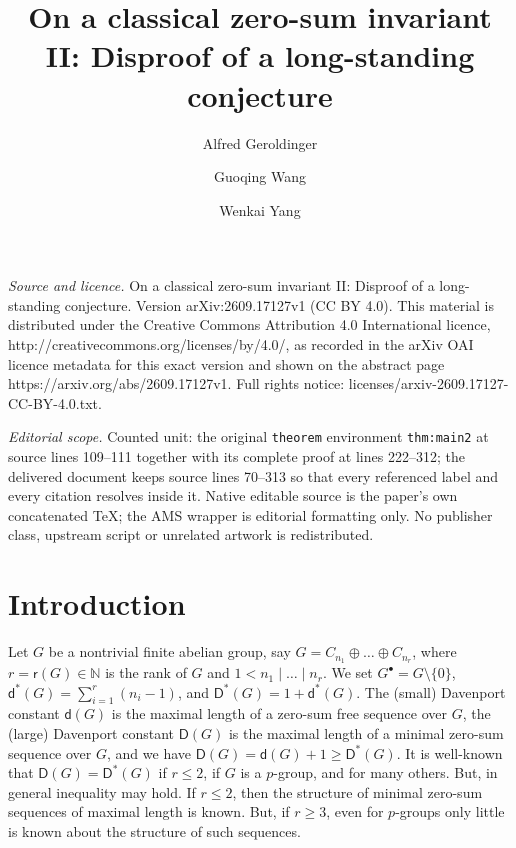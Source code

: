 \documentclass[10pt,a4paper]{amsart}
\begin{document}
\title[On a classical zero-sum invariant II: Disproof of a long-sta]{On a classical zero-sum invariant II: Disproof of a long-standing conjecture}
\author{Alfred Geroldinger \and Guoqing Wang \and Wenkai Yang}
\date{}
\maketitle
\noindent\emph{Source and licence.} On a classical zero-sum invariant II: Disproof of a long-standing conjecture. Version arXiv:2609.17127v1 (CC BY 4.0). This material is distributed under the Creative Commons Attribution 4.0 International licence, http://creativecommons.org/licenses/by/4.0/, as recorded in the arXiv OAI licence metadata for this exact version and shown on the abstract page https://arxiv.org/abs/2609.17127v1. Full rights notice: licenses/arxiv-2609.17127-CC-BY-4.0.txt.\par\smallskip
\noindent\textit{Editorial scope.} Counted unit: the original \texttt{theorem} environment \texttt{thm:main2} at source lines 109--111 together with its complete proof at lines 222--312; the delivered document keeps source lines 70--313 so that every referenced label and every citation resolves inside it. Native editable source is the paper's own concatenated TeX; the AMS wrapper is editorial formatting only. No publisher class, upstream script or unrelated artwork is redistributed.
\section{Introduction}


Let $G$ be a nontrivial finite abelian group, say $G = C_{n_1} \oplus \ldots \oplus C_{n_r}$, where $r=\mathsf r (G) \in \mathbb N$ is the rank of $G$ and $1 < n_1 \mid \ldots \mid n_r$. We set
$G^\bullet=G\setminus\{0\}$, $\mathsf d^* (G) = \sum_{i=1}^r (n_i-1)$, and  $\mathsf D^* (G) = 1 + \mathsf d^* (G)$. The (small) Davenport constant $\mathsf d (G)$ is the maximal length of a zero-sum free sequence over $G$,  the (large) Davenport constant $\mathsf D (G)$ is the maximal length of a minimal zero-sum sequence over $G$, and we have $\mathsf D (G) = \mathsf d (G)+1 \ge \mathsf D^* (G)$. It is well-known that $\mathsf D (G) = \mathsf D^* (G)$ if $r \le 2$, if $G$ is a $p$-group, and for many others. But, in general inequality may hold. If $r \le 2$, then the structure of minimal zero-sum sequences of maximal length is known. But, if $r \ge 3$, even for $p$-groups only little is known about the structure of such sequences.
\end{document}
